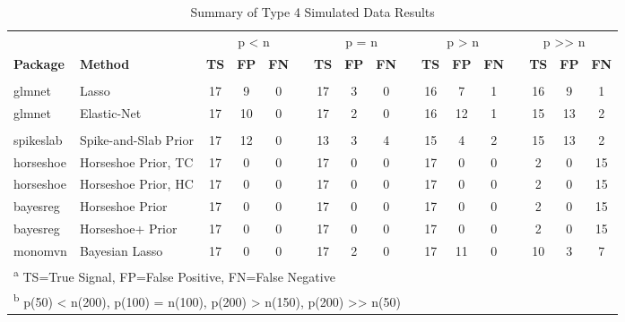 \documentclass[
  11pt,
]{article}
\begin{document}
\begin{landscape}

\begin{table}[H]

\caption{\label{tab:Results T4}Summary of Type 4 Simulated Data Results}
\centering
\fontsize{10}{12}\selectfont
\begin{tabular}[t]{>{}l|>{}l|>{}c|>{}c|>{}c|>{}c|>{}c|>{}c|>{}c|>{}c|>{}c|>{}c|>{}c|>{}c|>{}c|>{}c|>{}c|}
\toprule
\multicolumn{2}{c}{ } & \multicolumn{4}{c}{p < n} & \multicolumn{4}{c}{p = n} & \multicolumn{3}{c}{p > n} & \multicolumn{4}{c}{p >> n} \\
\cmidrule(l{3pt}r{3pt}){3-6} \cmidrule(l{3pt}r{3pt}){7-10} \cmidrule(l{3pt}r{3pt}){11-13} \cmidrule(l{3pt}r{3pt}){14-17}
\textbf{Package} & \textbf{Method} & \textbf{TS} & \textbf{FP} & \textbf{FN} &  & \textbf{TS} & \textbf{FP} & \textbf{FN} &  & \textbf{TS} & \textbf{FP} & \textbf{FN} &  & \textbf{TS} & \textbf{FP} & \textbf{FN}\\
\midrule
\addlinespace[0.3em]
\multicolumn{17}{l}{\textit{Frequentist Methods}}\\
\hspace{1em}glmnet & Lasso & 17 & 9 & 0 &  & 17 & 3 & 0 &  & 16 & 7 & 1 &  & 16 & 9 & 1\\
\hspace{1em}glmnet & Elastic-Net & 17 & 10 & 0 &  & 17 & 2 & 0 &  & 16 & 12 & 1 &  & 15 & 13 & 2\\
\addlinespace[0.3em]
\multicolumn{17}{l}{\textit{Bayesian Methods}}\\
\hspace{1em}spikeslab & Spike-and-Slab Prior & 17 & 12 & 0 &  & 13 & 3 & 4 &  & 15 & 4 & 2 &  & 15 & 13 & 2\\
\hspace{1em}horseshoe & Horseshoe Prior, TC & 17 & 0 & 0 &  & 17 & 0 & 0 &  & 17 & 0 & 0 &  & 2 & 0 & 15\\
\hspace{1em}horseshoe & Horseshoe Prior, HC & 17 & 0 & 0 &  & 17 & 0 & 0 &  & 17 & 0 & 0 &  & 2 & 0 & 15\\
\hspace{1em}bayesreg & Horseshoe Prior & 17 & 0 & 0 &  & 17 & 0 & 0 &  & 17 & 0 & 0 &  & 2 & 0 & 15\\
\hspace{1em}bayesreg & Horseshoe+ Prior & 17 & 0 & 0 &  & 17 & 0 & 0 &  & 17 & 0 & 0 &  & 2 & 0 & 15\\
\hspace{1em}monomvn & Bayesian Lasso & 17 & 0 & 0 &  & 17 & 2 & 0 &  & 17 & 11 & 0 &  & 10 & 3 & 7\\
\bottomrule
\multicolumn{17}{l}{\textsuperscript{a} TS=True Signal, FP=False Positive, FN=False Negative}\\
\multicolumn{17}{l}{\textsuperscript{b} p(50) < n(200), p(100) = n(100), p(200) > n(150), p(200) >> n(50)}\\
\end{tabular}
\end{table}

\end{landscape}
\end{document}
